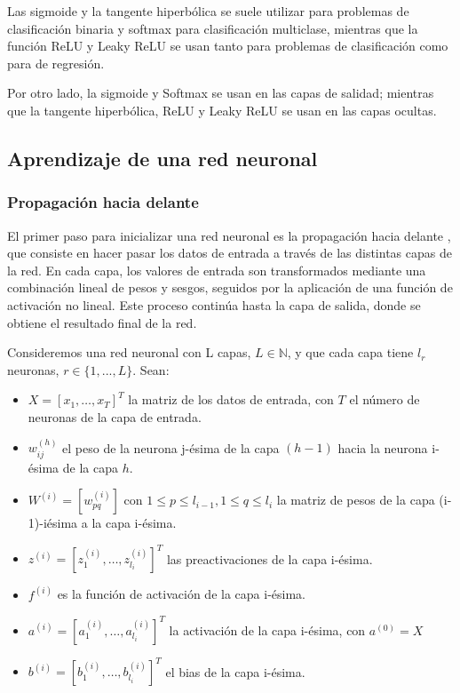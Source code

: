 \documentclass[12pt,twoside]{article}
\begin{document}
Las sigmoide y la tangente hiperbólica se suele utilizar para problemas de clasificación binaria y softmax para clasificación multiclase, mientras que la función ReLU y Leaky ReLU se usan tanto para problemas de clasificación como para de regresión.

Por otro lado, la sigmoide y Softmax se usan en las capas de salidad; mientras que la tangente hiperbólica, ReLU y Leaky ReLU se usan en las capas ocultas.

\subsection{Aprendizaje de una red neuronal}\label{sec:11}
\subsubsection{Propagación hacia delante}\label{sec:12}

El primer paso para inicializar una red neuronal es la propagación hacia delante \cite{redes2}, que consiste en hacer pasar los datos de entrada a través de las distintas capas de la red. En cada capa, los valores de entrada son transformados mediante una combinación lineal de pesos y sesgos, seguidos por la aplicación de una función de activación no lineal. Este proceso continúa hasta la capa de salida, donde se obtiene el resultado final de la red.

Consideremos una red neuronal con L capas, $L \in \mathbb{N}$, y que cada capa tiene $l_r$ neuronas, $r \in \{1, ..., L\}$. Sean:

\begin{itemize}
    \item $X = [x_1, \dots, x_{T}]^T$ la matriz de los datos de entrada, con $T$ el número de neuronas de la capa de entrada.
    \item $w_{ij}^{(h)}$ el peso de la neurona j-ésima de la capa $(h-1)$ hacia la neurona i-ésima de la capa $h$.
    \item $W^{(i)} = [w_{pq}^{(i)}]$ con $1 \leq p \leq l_{i-1},1 \leq q \leq l_{i}$ la matriz de pesos de la capa (i-1)-iésima a la capa i-ésima.
    \item $z^{(i)} = [z_1^{(i)}, \dots, z_{l_i}^{(i)}]^T$ las preactivaciones de la capa i-ésima.
    \item $f^{(i)}$ es la función de activación de la capa i-ésima.
    \item $a^{(i)} = [a_1^{(i)}, \dots, a_{l_i}^{(i)}]^T$ la activación de la capa i-ésima, con $a^{(0)} = X$
    \item $b^{(i)} = [b_1^{(i)}, \dots, b_{l_i}^{(i)}]^T$ el bias de la capa i-ésima.
\end{itemize}
\end{document}
